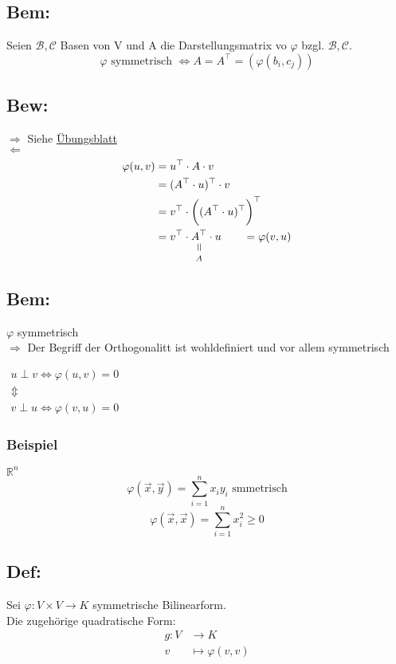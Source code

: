 \documentclass[titlepage,12pt,a4paper,ngerman]{report}
\newcommand{\verteq}{\rotatebox{90}{$\,=$}}
\newcommand{\equalto}[2]{\underset{\scriptstyle\overset{\mkern4mu\verteq}{#2}}{#1}}
\newcommand{\tx}[1]{\textrm{#1}}
\begin{document}
\subsection*{Bem:}
Seien $ \mathcal{B},\mathcal{C} $ Basen von V und A die Darstellungsmatrix vo $ \varphi $ bzgl. $ \mathcal{B},\mathcal{C} $.
$$ \varphi \tx{ symmetrisch } \Leftrightarrow A = A^\top = (\varphi(b_i,c_j))$$
\subsection{Bew:}
$\boxed{\Rightarrow}$ Siehe \underline{Übungsblatt}\\
$\boxed{\Leftarrow}$\\
\begin{align*}
\varphi(u,v) & = u^\top \cdot A \cdot v \\
& = (A^\top \cdot u)^\top \cdot v\\
& = v^\top \cdot \bigg( ( A^\top \cdot u)^\top \bigg)^\top\\
& = v^\top \cdot \equalto{A^\top}{A} \cdot u \qquad = \varphi(v,u) 
\end{align*}
\subsection*{Bem:}
$ \varphi $ symmetrisch\\
$ \Rightarrow $ Der Begriff der Orthogonalitt ist wohldefiniert und vor allem symmetrisch
\begin{center}
	$\begin{array}{c}
	u \perp v \Leftrightarrow \varphi(u,v) = 0\\
	\Updownarrow\\
	v \perp u \Leftrightarrow \varphi(v,u) = 0
	\end{array}$
\end{center}
\subsubsection{Beispiel}
$ \mathbb{R}^n $\\
$$\varphi(\vec{x},\vec{y}) = \sum_{i=1}^{n} x_i y_i \tx{ smmetrisch}$$ 
$$\varphi(\vec{x},\vec{x}) = \sum_{i=1}^{n} x_i^2 \ge 0$$
\subsection{Def:}
Sei $ \varphi: V \times V \to K $ symmetrische Bilinearform.\\
Die zugehörige quadratische Form:
\begin{align*}
g: V &\to K\\
v &\mapsto \varphi(v,v)
\end{align*}
\end{document}
